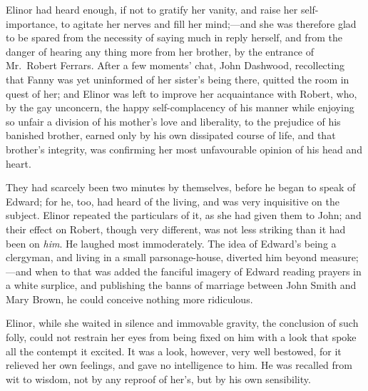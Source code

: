 \documentclass{article}
\begin{document}
Elinor had heard enough, if not to gratify her vanity,
and raise her self-importance, to agitate her nerves
and fill her mind;---and she was therefore glad to be
spared from the necessity of saying much in reply herself,
and from the danger of hearing any thing more from
her brother, by the entrance of Mr.\ Robert Ferrars.
After a few moments' chat, John Dashwood, recollecting that
Fanny was yet uninformed of her sister's being there,
quitted the room in quest of her; and Elinor was left
to improve her acquaintance with Robert, who, by the
gay unconcern, the happy self-complacency of his manner
while enjoying so unfair a division of his mother's love
and liberality, to the prejudice of his banished brother,
earned only by his own dissipated course of life, and that
brother's integrity, was confirming her most unfavourable
opinion of his head and heart.

They had scarcely been two minutes by themselves,
before he began to speak of Edward; for he, too, had heard
of the living, and was very inquisitive on the subject.
Elinor repeated the particulars of it, as she had given them
to John; and their effect on Robert, though very different,
was not less striking than it had been on \emph{him}.  He laughed
most immoderately.  The idea of Edward's being a clergyman,
and living in a small parsonage-house, diverted him
beyond measure;---and when to that was added the fanciful
imagery of Edward reading prayers in a white surplice,
and publishing the banns of marriage between John Smith and
Mary Brown, he could conceive nothing more ridiculous.

Elinor, while she waited in silence and immovable
gravity, the conclusion of such folly, could not restrain
her eyes from being fixed on him with a look that spoke
all the contempt it excited.  It was a look, however,
very well bestowed, for it relieved her own feelings, and gave
no intelligence to him.  He was recalled from wit to wisdom,
not by any reproof of her's, but by his own sensibility.
\end{document}
